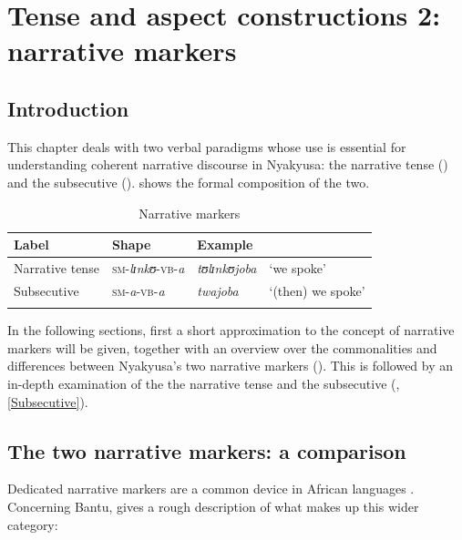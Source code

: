 \chapter{Tense and aspect constructions 2: narrative markers}
\label{NarrativeMarkers}
\section{Introduction}
This chapter deals with two verbal paradigms whose use is essential for understanding coherent narrative discourse in Nyakyusa: the narrative tense () and the subsecutive ().  shows the formal composition of the two.

\begin{table}[H]
\begin{center}
\begin{tabular}{llll}
\lsptoprule
\footnotesize{Label} & \footnotesize{Shape} & \footnotesize{Example}\\
\midrule
Narrative tense & \textsc{sm}-\textit{lɪnkʊ}-\textsc{vb}-\textit{a} & \textit{tʊlɪnkʊjoba} & \lq we spoke' \\  
Subsecutive & \textsc{sm}-\textit{a}-\textsc{vb}-\textit{a} & \textit{twajoba} & \lq (then) we spoke'\\
\lspbottomrule  
\end{tabular}
\caption{Narrative markers}\label{TableNarrativeMarkers}
\end{center}
\end{table}

In the following sections, first a short approximation to the concept of narrative markers will be given, together with an overview over the commonalities and differences between Nyakyusa's two narrative markers (). This is followed by an in-depth examination of the the narrative tense and the subsecutive (, \ref{Subsecutive}).

\section{The two narrative markers: a comparison} \label{NarrativeMarkersComparison}

\label{NarrativeMarkersApproximation}
Dedicated narrative markers are a common device in African languages \citep[113f]{DahlOe1985}. Concerning Bantu, \citet{NurseD2008} gives a rough description of what makes up this wider category:

